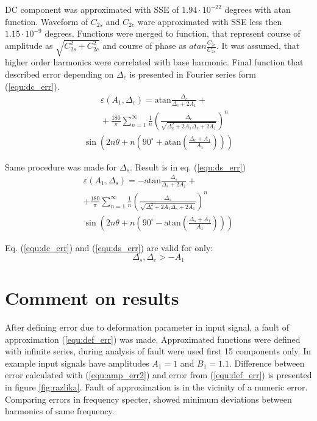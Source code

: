 \documentclass[a4paper]{article}
\begin{document}
DC component was approximated with SSE of $1.94 \cdot 10^{-22}$ degrees with atan function. Waveform of $C_{2s}$ and $C_{2c}$ ware approximated with SSE less then $1.15 \cdot 10^{-9}$ degrees. Functions were  merged to function, that represent course of amplitude as $\sqrt{C_{2s}^2+C_{2c}^2}$ and course of phase as $atan \frac{C_{2c}}{C_{2s}}$. It was assumed, that higher order harmonics were correlated with base harmonic.
Final function that described error depending on $\Delta_c$ is presented in Fourier series form (\ref{equ:dc_err}).
\begin{multline}
\label{equ:dc_err}
\qquad\varepsilon(A_1, \Delta_c) = \mathrm{atan}\frac{\Delta_c}{\Delta_c+2 A_1}+\\
\qquad+\frac{180}{\pi} \sum_{n=1}^{\infty}\frac{1}{n} (\frac{\Delta_c}{\sqrt{\Delta_c^2+2 A_1 \Delta_c+2 A_1}})^n\\ \sin (2n \theta+n (90^\circ+ \mathrm{ atan}(\frac{\Delta_c+A_1}{A_1})))
\end{multline}

Same procedure was made for $\Delta_s$. Result is in eq. (\ref{equ:ds_err})
\begin{multline}
\label{equ:ds_err}
\varepsilon(A_1, \Delta_s) = -\mathrm{atan}\frac{\Delta_s}{\Delta_s+2 A_1}+\\+\frac{180}{\pi} \sum_{n=1}^{\infty}\frac{1}{n} (\frac{\Delta_s}{\sqrt{\Delta_s^2+2 A_1 \Delta_s+2A_1}})^n\\ \sin (2n \theta+n (90^\circ- \mathrm{ atan}(\frac{\Delta_s+A_1}{A_1})))
\end{multline}

Eq. (\ref{equ:dc_err}) and (\ref{equ:ds_err}) are valid for only: 
\begin{equation*}
\Delta_s, \Delta_c > -A_1
\end{equation*}

\section{Comment on results}
After defining error due to deformation parameter in input signal, a fault of approximation (\ref{equ:def_err}) was made. Approximated functions were defined with infinite series, during analysis of fault were used first 15 components only. In example input signals have amplitudes $A_1 = 1$ and $B_1 = 1.1$. Difference between error calculated with (\ref{equ:amp_err2}) and error from (\ref{equ:def_err})  is presented in figure \ref{fig:razlika}. Fault of approximation is in the vicinity of a numeric error. Comparing errors in frequency specter, showed minimum deviations between harmonics of same frequency.
\end{document}

